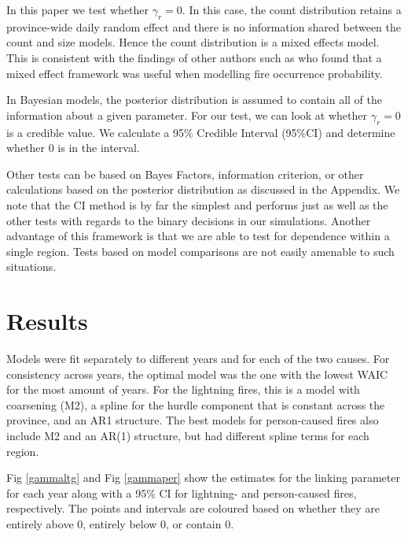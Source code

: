 \documentclass[10pt,letterpaper]{article}
\begin{document}
In this paper we test whether \(\gamma_r=0\). In this case, the count
distribution retains a province-wide daily random effect and
there is no information shared between the count and size models. Hence the count
distribution is a mixed effects model. This is consistent with the findings of other authors such as
\cite{brillingerProbabilisticRiskAssessment2006} who found that a mixed effect framework was useful when modelling fire occurrence probability.

In Bayesian models, the posterior distribution is assumed to contain all
of the information about a given parameter. For our test, we can look at
whether \(\gamma_r = 0\) is a credible value. We calculate a 95\% Credible
Interval (95\%CI) and determine whether 0 is in the interval.

Other tests can be based on Bayes Factors, information criterion, or
other calculations based on the posterior distribution as discussed in
the Appendix. We note that the CI method is by far the simplest and
performs just as well as the other tests with regards to the binary
decisions in our simulations. Another advantage of this framework is
that we are able to test for dependence within a single region.
Tests based on model comparisons are not easily amenable to such
situations.

\hypertarget{results}{%
\section{Results}\label{results}}

Models were fit separately to different years and for each of the
two causes. For consistency across years, the optimal model was the one
with the lowest WAIC for the most amount of years. For the lightning
fires, this is a model with coarsening (M2), a spline for the hurdle
component that is constant across the province, and an AR1 structure.
The best models for person-caused fires also include M2 and an AR(1)
structure, but had different spline terms for each region.

Fig \ref{gammaltg} and Fig \ref{gammaper} show the estimates for the
linking parameter for each year along with a 95\% CI for lightning- and person-caused fires, respectively. The points and intervals are coloured based on whether they
are entirely above 0, entirely below 0, or contain 0.
\end{document}
